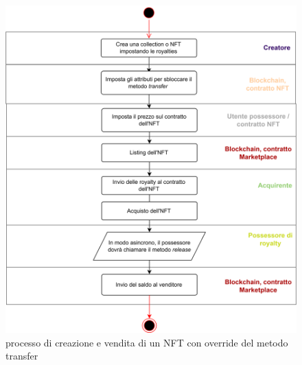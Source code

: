 \begin{figure}[H]
    \centering
    \includegraphics[width=1\textwidth]{images/creazioneVenditaNFTOverride.png}
    \caption{processo di creazione e vendita di un NFT con override del metodo transfer}
    \label{fig:creazioneVenditaNFTOverride}
\end{figure}

\newpage